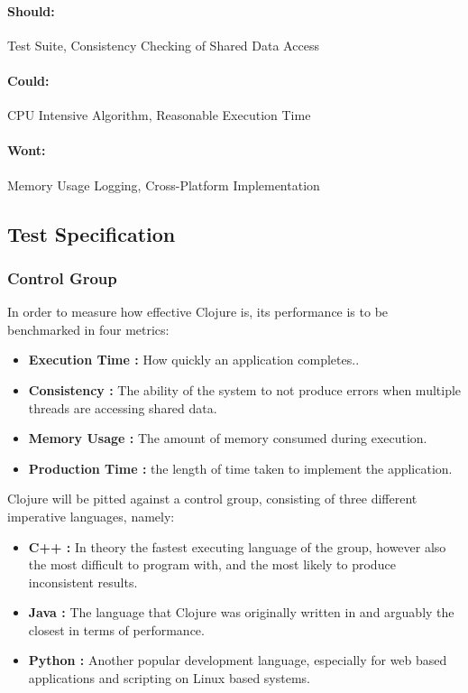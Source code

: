 \documentclass[12pt,a4paper]{article}
\begin{document}
\paragraph{Should:}
Test Suite,
Consistency Checking of Shared Data Access

\paragraph{Could:}
CPU Intensive Algorithm,
Reasonable Execution Time

\paragraph{Wont:}
Memory Usage Logging, 
Cross-Platform Implementation


\newpage
\subsection{Test Specification}

\subsubsection{Control Group}

In order to measure how effective Clojure is, its performance is to be benchmarked in four metrics:

\begin{itemize} \itemsep0pt
        \item \textbf{Execution Time :} How quickly an application completes..
        \item \textbf{Consistency :} The ability of the system to not produce errors when multiple threads are accessing shared data.
        \item \textbf{Memory Usage :} The amount of memory consumed during execution.
        \item \textbf{Production Time :} the length of time taken to implement the application.
\end{itemize}

Clojure will be pitted against a control group, consisting of three different imperative languages, namely:

\begin{itemize} \itemsep0pt
        \item \textbf{C++ :} In theory the fastest executing language of the group, however also the most difficult to program with, and the most likely to produce inconsistent results.
        \item \textbf{Java :} The language that Clojure was originally written in and arguably the closest in terms of performance.
        \item \textbf{Python :} Another popular development language, especially for web based applications and scripting on Linux based systems.
\end{itemize}
\end{document}
